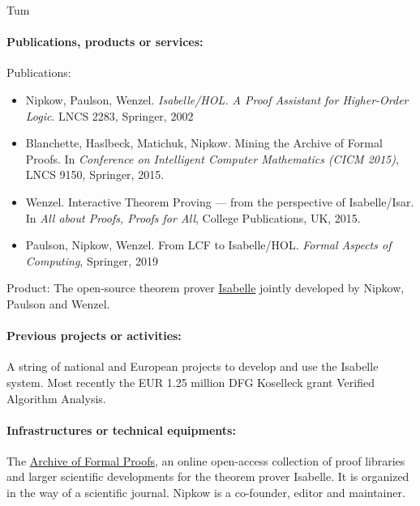 \begin{sitedescription}{Tum}
\begin{compactitem}
\item{} 
\end{compactitem}

\paragraph{Publications, products or services:}

Publications:
\begin{itemize}
\item Nipkow, Paulson, Wenzel. \emph{Isabelle/HOL. A Proof
    Assistant for Higher-Order Logic}. LNCS 2283, Springer, 2002
\item Blanchette, Haslbeck, Matichuk, Nipkow. Mining the Archive of
  Formal Proofs. In \emph{Conference on Intelligent Computer
    Mathematics (CICM 2015)}, LNCS 9150, Springer, 2015.
\item Wenzel. Interactive Theorem Proving --- from the perspective of Isabelle/Isar.
  In \emph{All about Proofs, Proofs for All}, College Publications, UK, 2015.
\item Paulson, Nipkow, Wenzel. From LCF to
  Isabelle/HOL. \emph{Formal Aspects of Computing}, Springer, 2019
\end{itemize}

Product: The open-source theorem prover  \href{http://isabelle.in.tum.de}{Isabelle}
jointly developed by Nipkow, Paulson and Wenzel.

\paragraph{Previous projects or activities:}

A string of national and European projects to develop and use the Isabelle
system. Most recently the EUR 1.25 million DFG Koselleck grant Verified Algorithm Analysis.

\paragraph{Infrastructures or technical equipments:}

The \href{http://www.isa-afp.org}{Archive of Formal Proofs}, an online
open-access collection of proof libraries and larger scientific
developments for the theorem prover Isabelle. It is organized in the
way of a scientific journal.  Nipkow is a co-founder, editor and maintainer.


\end{sitedescription}
